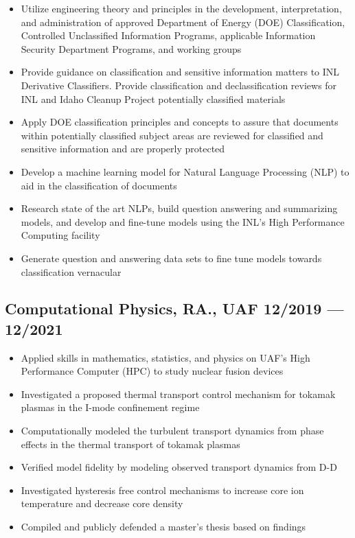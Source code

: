 \documentclass[letterpaper,11pt]{article}
\begin{document}
\begin{itemize}
\item  Utilize engineering theory and principles in the development, interpretation, and administration of approved Department of Energy (DOE) Classification, Controlled Unclassified Information Programs, applicable Information
Security Department Programs, and working groups
\item  Provide guidance on classification and sensitive information matters to INL Derivative Classifiers. Provide classification and declassification reviews for INL and Idaho Cleanup Project potentially classified materials
\item  Apply DOE classification principles and concepts to assure that documents within potentially classified subject areas are reviewed for classified and sensitive information and are properly protected
\item  Develop a machine learning model for Natural Language Processing (NLP) to aid in the classification of documents
\item  Research state of the art NLPs, build question answering and summarizing models, and develop and fine-tune models using the INL’s High Performance Computing facility
\item  Generate question and answering data sets to fine tune models towards classification vernacular
\end{itemize}






\subsection*{{\color{cvblue}Computational Physics, RA., UAF } \hfill 12/2019 --- 12/2021} 
    \begin{itemize}
    \item Applied skills in mathematics, statistics, and physics on UAF's High Performance Computer (HPC) to study nuclear fusion devices  
\item Investigated a proposed thermal transport control mechanism for tokamak plasmas in the I-mode confinement regime 
\item Computationally modeled the turbulent transport dynamics from phase effects in the thermal transport of tokamak plasmas
\item Verified model fidelity by modeling observed transport dynamics from D-D
\item Investigated hysteresis free control mechanisms to increase core ion temperature and decrease core density 
\item Compiled and publicly defended a master's thesis based on findings
    \end{itemize}
\end{document}
